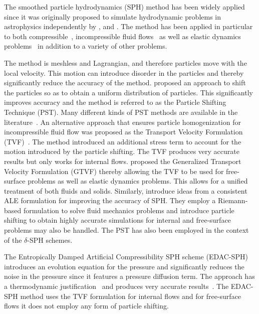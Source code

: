 \documentclass[preprint,12pt]{elsarticle}
\begin{document}
The smoothed particle hydrodynamics (SPH) method has been widely applied since
it was originally proposed to simulate hydrodynamic problems in astrophysics
independently by \citet{lucy77}, and \citet{monaghan-gingold-stars-mnras-77}.
The method has been applied in particular to both
compressible~\cite{monaghan-review:2005}, incompressible fluid
flows~\cite{sph:fsf:monaghan-jcp94,sph:psph:cummins-rudman:jcp:1999} as well
as elastic dynamics problems~\cite{randles-1996,gray-ed-2001} in addition to a
variety of other problems\cite{rafiee:fsi-2009,khayyer-fsi-2018,
  sun2021accurate, bui2008lagrangian}.

The method is meshless and Lagrangian, and therefore particles move with the
local velocity. This motion can introduce disorder in the particles and
thereby significantly reduce the accuracy of the method.
\citet{acc_stab_xu:jcp:2009} proposed an approach to shift the particles so as
to obtain a uniform distribution of particles. This significantly improves
accuracy and the method is referred to as the Particle Shifting Technique
(PST). Many different kinds of PST methods are available in the
literature~\cite{diff_smoothing_sph:lind:jcp:2012,fickian_smoothing_sph:skillen:cmame:2013,huang_kernel_2019,ye2019sph}.
An alternative approach that ensures particle homogenization for
incompressible fluid flow was proposed as the Transport Velocity Formulation
(TVF)~\cite{Adami2013}. The method introduced an additional stress term to
account for the motion introduced by the particle shifting. The TVF produces
very accurate results but only works for internal flows.
\citet{zhang_hu_adams17} proposed the Generalized Transport Velocity
Formulation (GTVF) thereby allowing the TVF to be used for free-surface
problems as well as elastic dynamics problems. This allows for a unified
treatment of both fluids and solids. Similarly, \citet{oger_ale_sph_2016}
introduce ideas from a consistent ALE formulation for improving the accuracy
of SPH. They employ a Riemann-based formulation to solve fluid mechanics
problems and introduce particle shifting to obtain highly accurate simulations
for internal and free-surface problems may also be handled. The PST has also
been employed in the context of the $\delta$-SPH
schemes\cite{sun_consistent_2019}.

The Entropically Damped Artificial Compressibility SPH scheme
(EDAC-SPH)~\cite{edac-sph:cf:2019} introduces an evolution equation for the
pressure and significantly reduces the noise in the pressure since it features
a pressure diffusion term. The approach has a thermodynamic
justification~\cite{Clausen2013} and produces very accurate
results~\cite{edac-sph:cf:2019}. The EDAC-SPH method uses the TVF formulation
for internal flows and for free-surface flows it does not employ any form of
particle shifting.
\end{document}
